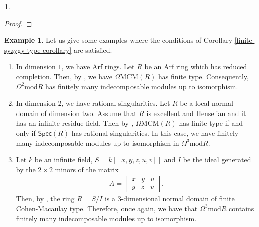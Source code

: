 \documentclass[12pt]{amsart}
\newcommand{\module}{\mathrm{mod}}
\newcommand{\MCM}{\mathrm{MCM}}
\newcommand{\spec}{\mathsf{Spec}}
\theoremstyle{definition}
\newtheorem{example}[theorem]{Example}
\newtheorem{chunk}[theorem]{}
\numberwithin{equation}{theorem}
\begin{document}
\begin{chunk}
\begin{proof}
    \end{proof}
    \begin{example}
        Let us give some examples where the conditions of Corollary \ref{finite-syzygy-type-corollary} are satisfied.
        \begin{enumerate}
            \item In dimension $1$, we have Arf rings. Let $R$ be an Arf ring which has reduced completion. Then, by \cite[Corollary 4.5]{Dao}, we have $\Omega \MCM(R)$ has finite type. Consequently, $\Omega^2 \module R$ has finitely many indecomposable modules up to isomorphism.
            \item In dimension 2, we have rational singularities. Let $R$ be a local normal domain of dimension two. Assume that $R$ is excellent and Henselian and it has an infinite residue field. Then by \cite[Corollary 3.3]{Dao-Iyama-Takahashi-Vial}, $\Omega \MCM(R)$ has finite type if and only if $\spec(R)$ has rational singularities. In this case, we have finitely many indecomposable modules up to isomorphism in $\Omega^3 \module R$.
            \item Let $k$ be an infinite field, $S = k[[x,y,z,u,v]] $ and $I$ be the ideal generated by the $2 \times 2$ minors of the matrix
            \begin{align*}
            A = \begin{bmatrix}
                x & y & u \\ 
                y & z & v
            \end{bmatrix}.
            \end{align*}
            Then, by \cite[16.12]{Yoshino}, the ring $R = S/I$ is a 3-dimensional normal domain of finite Cohen-Macaulay type. Therefore, once again, we have that $\Omega^3 \module R$ contains finitely many indecomposable modules up to isomorphism.
            
        \end{enumerate}
    \end{example}
     




\end{chunk}
\end{document}
